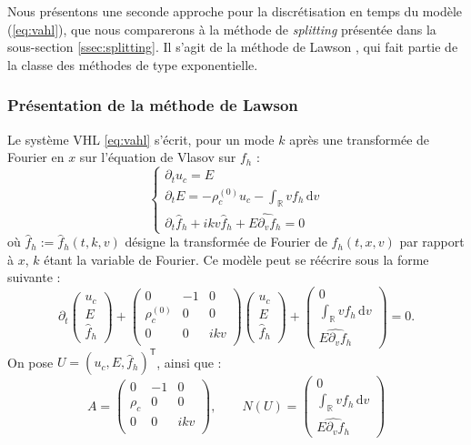 Nous présentons une seconde approche pour la discrétisation en temps du modèle (\ref{eq:vahl}), que nous comparerons à la méthode de \emph{splitting} présentée dans la sous-section \ref{ssec:splitting}. Il s'agit de la méthode de Lawson \cite{Lawson:1967}, qui fait partie de la classe des méthodes de type exponentielle.

\subsubsection{Présentation de la méthode de Lawson}

Le système VHL \eqref{eq:vahl} s'écrit, pour un mode $k$ après une transformée de Fourier en $x$ sur l'équation de Vlasov sur $f_h$ :
\begin{equation}
  \begin{cases}
    \partial_t u_c = E \\
    \partial_t E = -\rho_c^{(0)}u_c - \int_\mathbb{R} vf_h\,\mathrm{d}v \\
    \partial_t \hat{f}_h + ikv \hat{f}_h + \widehat{E\partial_vf_h} = 0
  \end{cases}
  \label{eq:vahlfft}
\end{equation}
où $\hat{f}_h:= \hat{f}_h(t, k, v)$ désigne la transformée de Fourier de $f_h(t, x,v)$ par rapport à $x$, $k$ étant la variable de Fourier. Ce modèle peut se réécrire sous la forme suivante :
$$
  \partial_t\begin{pmatrix} u_c \\ E \\ \hat{f}_h \end{pmatrix}
  + \begin{pmatrix}
    0            & -1 & 0   \\
    \rho_c^{(0)} &  0 & 0   \\
    0            &  0 & ikv \\
  \end{pmatrix}\begin{pmatrix} u_c \\ E \\ \hat{f}_h \end{pmatrix}
  + \begin{pmatrix} 0 \\ \int_\mathbb{R} vf_h\,\mathrm{d}v \\ \widehat{E\partial_vf_h} \end{pmatrix}
  = 0. 
$$
On pose $U =\left(u_c , E , \hat{f}_h\right)^{\textsf{T}}$, ainsi que :
$$
  A = \begin{pmatrix}0 & -1 & 0 \\ \rho_c & 0 & 0 \\ 0 & 0 & ikv \\ \end{pmatrix},\qquad N(U) = \begin{pmatrix} 0 \\ \int_\mathbb{R} vf_h\,\mathrm{d}v \\ \widehat{E\partial_vf_h} \end{pmatrix}
$$
